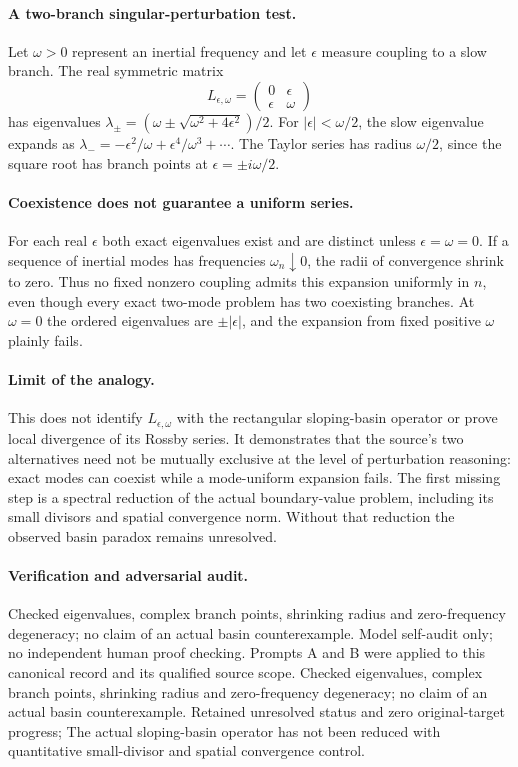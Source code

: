 \documentclass[11pt]{article}
\begin{document}
\paragraph{A two-branch singular-perturbation test.} Let $\omega>0$ represent an inertial frequency and let $\epsilon$ measure coupling to a slow branch. The real symmetric matrix
\[
 L_{\epsilon,\omega}=\begin{pmatrix}0&\epsilon\\\epsilon&\omega\end{pmatrix}
\]
has eigenvalues $\lambda_\pm=(\omega\pm\sqrt{\omega^2+4\epsilon^2})/2$. For $|\epsilon|<\omega/2$, the slow eigenvalue expands as $\lambda_-=-\epsilon^2/\omega+\epsilon^4/\omega^3+\cdots$. The Taylor series has radius $\omega/2$, since the square root has branch points at $\epsilon=\pm i\omega/2$.

\paragraph{Coexistence does not guarantee a uniform series.} For each real $\epsilon$ both exact eigenvalues exist and are distinct unless $\epsilon=\omega=0$. If a sequence of inertial modes has frequencies $\omega_n\downarrow0$, the radii of convergence shrink to zero. Thus no fixed nonzero coupling admits this expansion uniformly in $n$, even though every exact two-mode problem has two coexisting branches. At $\omega=0$ the ordered eigenvalues are $\pm|\epsilon|$, and the expansion from fixed positive $\omega$ plainly fails.

\paragraph{Limit of the analogy.} This does not identify $L_{\epsilon,\omega}$ with the rectangular sloping-basin operator or prove local divergence of its Rossby series. It demonstrates that the source's two alternatives need not be mutually exclusive at the level of perturbation reasoning: exact modes can coexist while a mode-uniform expansion fails. The first missing step is a spectral reduction of the actual boundary-value problem, including its small divisors and spatial convergence norm. Without that reduction the observed basin paradox remains unresolved.

\paragraph{Verification and adversarial audit.}
Checked eigenvalues, complex branch points, shrinking radius and zero-frequency degeneracy; no claim of an actual basin counterexample. Model self-audit only; no independent human proof checking. Prompts A and B were applied to this canonical record and its qualified source scope. Checked eigenvalues, complex branch points, shrinking radius and zero-frequency degeneracy; no claim of an actual basin counterexample. Retained unresolved status and zero original-target progress; The actual sloping-basin operator has not been reduced with quantitative small-divisor and spatial convergence control.
\end{document}

